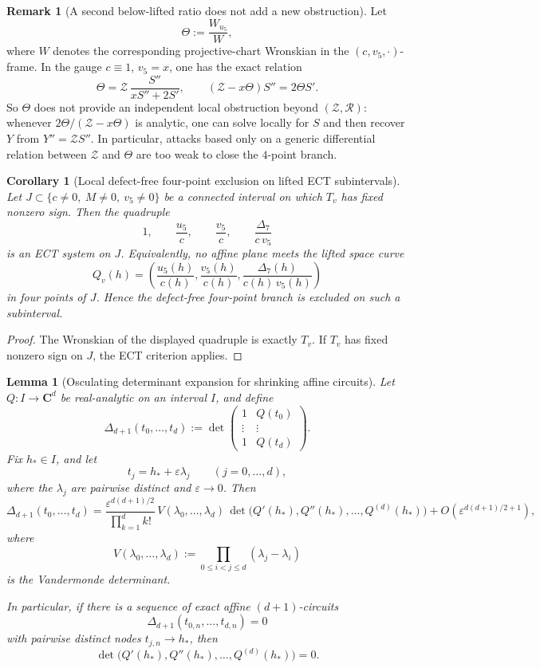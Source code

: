 \documentclass[11pt,a4paper]{amsart}
\theoremstyle{plain}
\newtheorem{lemma}[theorem]{Lemma}
\newtheorem{corollary}[theorem]{Corollary}
\theoremstyle{definition}
\newtheorem{remark}[theorem]{Remark}
\begin{document}
\begin{remark}[A second below-lifted ratio does not add a new obstruction]
\label{rem:second-below-lifted-ratio-no-new-obstruction}
Let
\[
\Theta:=\frac{W_{u_5}}{W},
\]
where $W$ denotes the corresponding projective-chart Wronskian in the
$(c,v_5,\cdot)$-frame. In the gauge $c\equiv 1$, $v_5=x$, one has the
exact relation
\[
\Theta=\mathcal Z\,\frac{S''}{xS''+2S'},
\qquad
(\mathcal Z-x\Theta)S''=2\Theta S'.
\]
So $\Theta$ does not provide an independent local obstruction beyond
$(\mathcal Z,\mathcal R)$: whenever $2\Theta/(\mathcal Z-x\Theta)$ is
analytic, one can solve locally for $S$ and then recover $Y$ from
$Y''=\mathcal Z S''$. In particular, attacks based only on a generic
differential relation between $\mathcal Z$ and $\Theta$ are too weak to
close the $4$-point branch.
\end{remark}

\begin{corollary}[Local defect-free four-point exclusion on lifted ECT subintervals]
\label{cor:local-four-point-exclusion-lifted-vpatch}
Let $J\subset\{c\neq 0,\ M\neq 0,\ v_5\neq 0\}$ be a connected interval on
which $T_v$ has fixed nonzero sign. Then the quadruple
\[
1,\qquad \frac{u_5}{c},\qquad \frac{v_5}{c},\qquad
\frac{\Delta_7}{c\,v_5}
\]
is an ECT system on $J$. Equivalently, no affine plane meets the lifted
space curve
\[
Q_v(h)=\left(\frac{u_5(h)}{c(h)},\frac{v_5(h)}{c(h)},
\frac{\Delta_7(h)}{c(h)\,v_5(h)}\right)
\]
in four points of $J$. Hence the defect-free four-point branch is excluded
on such a subinterval.
\end{corollary}

\begin{proof}
The Wronskian of the displayed quadruple is exactly $T_v$. If $T_v$ has
fixed nonzero sign on $J$, the ECT criterion applies.
\end{proof}

\begin{lemma}[Osculating determinant expansion for shrinking affine circuits]
\label{lem:osculating-determinant-expansion}
Let $Q:I\to \mathbf C^d$ be real-analytic on an interval $I$, and define
\[
\Delta_{d+1}(t_0,\dots,t_d)
:=
\det\!\begin{pmatrix}
1 & Q(t_0)\\
\vdots & \vdots\\
1 & Q(t_d)
\end{pmatrix}.
\]
Fix $h_*\in I$, and let
\[
t_j=h_*+\varepsilon \lambda_j
\qquad (j=0,\dots,d),
\]
where the $\lambda_j$ are pairwise distinct and $\varepsilon\to 0$. Then
\[
\Delta_{d+1}(t_0,\dots,t_d)
=
\frac{\varepsilon^{d(d+1)/2}}{\prod_{k=1}^d k!}\,
V(\lambda_0,\dots,\lambda_d)\,
\det\!\bigl(Q'(h_*),Q''(h_*),\dots,Q^{(d)}(h_*)\bigr)
+
O\!\left(\varepsilon^{d(d+1)/2+1}\right),
\]
where
\[
V(\lambda_0,\dots,\lambda_d):=\prod_{0\le i<j\le d}(\lambda_j-\lambda_i)
\]
is the Vandermonde determinant.

In particular, if there is a sequence of exact affine $(d+1)$-circuits
\[
\Delta_{d+1}(t_{0,n},\dots,t_{d,n})=0
\]
with pairwise distinct nodes $t_{j,n}\to h_*$, then
\[
\det\!\bigl(Q'(h_*),Q''(h_*),\dots,Q^{(d)}(h_*)\bigr)=0.
\]
\end{lemma}
\end{document}
